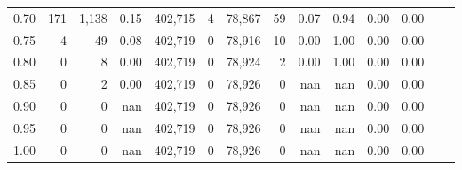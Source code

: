 \begin{tabular}{rrrrrrrrrrrrrr}
0.70 &      171 &   1,138 &     0.15 &  402,715 &        4 &  78,867 &      59 &  0.07 &  0.94 &  0.00 &      0.00 \\
0.75 &        4 &      49 &     0.08 &  402,719 &        0 &  78,916 &      10 &  0.00 &  1.00 &  0.00 &      0.00 \\
0.80 &        0 &       8 &     0.00 &  402,719 &        0 &  78,924 &       2 &  0.00 &  1.00 &  0.00 &      0.00 \\
0.85 &        0 &       2 &     0.00 &  402,719 &        0 &  78,926 &       0 &   nan &   nan &  0.00 &      0.00 \\
0.90 &        0 &       0 &      nan &  402,719 &        0 &  78,926 &       0 &   nan &   nan &  0.00 &      0.00 \\
0.95 &        0 &       0 &      nan &  402,719 &        0 &  78,926 &       0 &   nan &   nan &  0.00 &      0.00 \\
1.00 &        0 &       0 &      nan &  402,719 &        0 &  78,926 &       0 &   nan &   nan &  0.00 &      0.00 \\
\bottomrule
\end{tabular}
